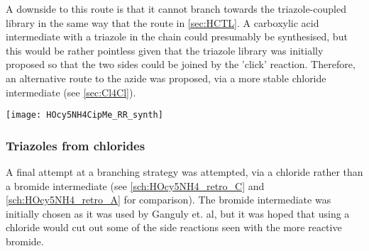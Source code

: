 A downside to this route is that it cannot branch towards the triazole-coupled library in the same way that the route in \ref{sec:HCTL}. A carboxylic acid intermediate with a triazole in the chain could presumably be synthesised, but this would be rather pointless given that the triazole library was initially proposed so that the two sides could be joined by the 'click' reaction.
Therefore, an alternative route to the azide was proposed, via a more stable chloride intermediate (see \ref{sec:Cl4Cl}).


\begin{scheme}[H]
	\begin{center}
		\texttt{[image: HOcy5NH4CipMe\_RR\_synth]}
		\caption{Synthesis of the cyclopentanol-CipMe conjugates   (\textit{SS}) and  (\textit{RR}) by peptide coupling. 
		\textit{SS} enantiomers are shown, but both were synthesised.
			a) NaI, TEA, acetonitrile, 100 $^{\circ}$C, 16 h, 49.9 \%. %
			b) TFA,  , r.t., 18 h, 95.6 \%. %
			c) EDC, HOBt, DIPEA, DMF, r.t., 16 h, 
			 (\textit{SS}): 54.7 \%,  %
			 (\textit{RR}): 38.7 \%. %
			\label{sch:HOcy5NH4CipMe_RR_synth}}
	\end{center}
\end{scheme}



\subsubsection{Triazoles from chlorides\label{sec:Cl4Cl}}

A final attempt at a branching strategy was attempted, via a chloride rather than a bromide intermediate (see \ref{sch:HOcy5NH4_retro_C} and \ref{sch:HOcy5NH4_retro_A} for comparison). The bromide intermediate was initially chosen as it was used by Ganguly et. al\cite{Ganguly2011}, but it was hoped that using a chloride would cut out some of the side reactions seen with the more reactive bromide.

